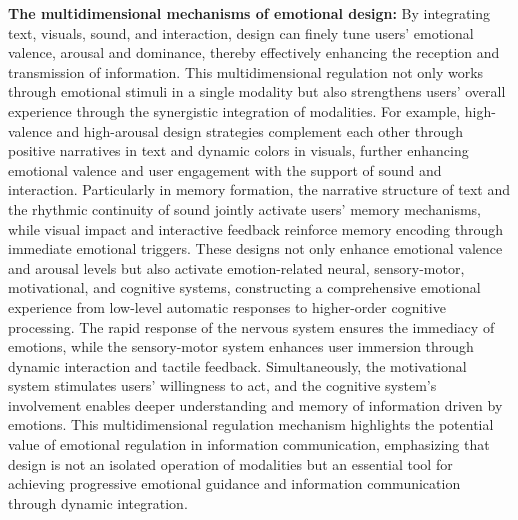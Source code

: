 \textbf{The multidimensional mechanisms of emotional design: }By integrating text, visuals, sound, and interaction, design can finely tune users’ emotional valence, arousal and dominance, thereby effectively enhancing the reception and transmission of information. This multidimensional regulation not only works through emotional stimuli in a single modality but also strengthens users’ overall experience through the synergistic integration of modalities. For example, high-valence and high-arousal design strategies complement each other through positive narratives in text and dynamic colors in visuals, further enhancing emotional valence and user engagement with the support of sound and interaction. Particularly in memory formation, the narrative structure of text and the rhythmic continuity of sound jointly activate users’ memory mechanisms, while visual impact and interactive feedback reinforce memory encoding through immediate emotional triggers. These designs not only enhance emotional valence and arousal levels but also activate emotion-related neural, sensory-motor, motivational, and cognitive systems, constructing a comprehensive emotional experience from low-level automatic responses to higher-order cognitive processing. The rapid response of the nervous system ensures the immediacy of emotions, while the sensory-motor system enhances user immersion through dynamic interaction and tactile feedback. Simultaneously, the motivational system stimulates users’ willingness to act, and the cognitive system’s involvement enables deeper understanding and memory of information driven by emotions. This multidimensional regulation mechanism highlights the potential value of emotional regulation in information communication, emphasizing that design is not an isolated operation of modalities but an essential tool for achieving progressive emotional guidance and information communication through dynamic integration.


